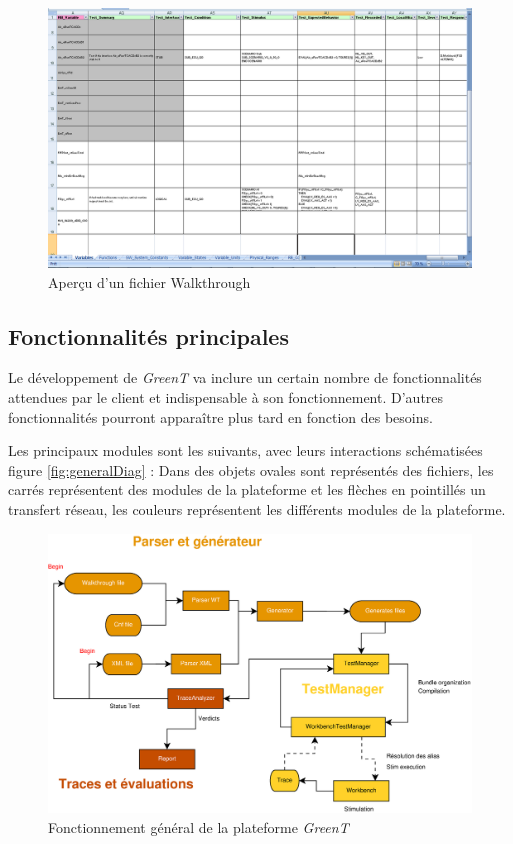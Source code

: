 		\begin{figure}[H]
			\centering
			\includegraphics[width=18.5cm]{contents/images/walkthrough.png}
			\caption{Aperçu d'un fichier Walkthrough}
		\end{figure}

	\subsection{Fonctionnalités principales}
	Le développement de \textit{GreenT} va inclure un certain nombre de fonctionnalités attendues par le client et indispensable à son fonctionnement. D'autres fonctionnalités pourront apparaître plus tard en fonction des besoins.

	Les principaux modules sont les suivants, avec leurs interactions schématisées figure \ref{fig:generalDiag} : 
			Dans des objets ovales sont représentés des fichiers, les carrés représentent des modules de la plateforme et les flèches en pointillés un transfert réseau, les couleurs représentent les différents modules de la plateforme.

			\begin{figure}[H]
			\centering
			\includegraphics[width=16.5cm]{contents/images/generalDiag.eps}
			\caption{Fonctionnement général de la plateforme \textit{GreenT}}
			\label{fig:generalDig}
		\end{figure}	

